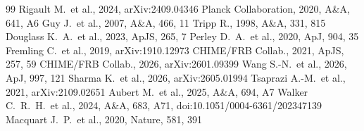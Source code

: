 \begin{thebibliography}{99}
 Rigault M.\ et al., 2024, arXiv:2409.04346
 Planck Collaboration, 2020, A\&A, 641, A6
 Guy J.\ et al., 2007, A\&A, 466, 11
 Tripp R., 1998, A\&A, 331, 815
 Douglass K.~A.\ et al., 2023, ApJS, 265, 7
 Perley D.~A.\ et al., 2020, ApJ, 904, 35
 Fremling C.\ et al., 2019, arXiv:1910.12973
 CHIME/FRB Collab., 2021, ApJS, 257, 59
 CHIME/FRB Collab., 2026, arXiv:2601.09399
 Wang S.-N.\ et al., 2026, ApJ, 997, 121
 Sharma K.\ et al., 2026, arXiv:2605.01994
 Tsaprazi A.-M.\ et al., 2021, arXiv:2109.02651
 Aubert M.\ et al., 2025, A\&A, 694, A7
 Walker C.~R.~H.\ et al., 2024, A\&A, 683, A71, doi:10.1051/0004-6361/202347139
 Macquart J.~P.\ et al., 2020, Nature, 581, 391
\end{thebibliography}
